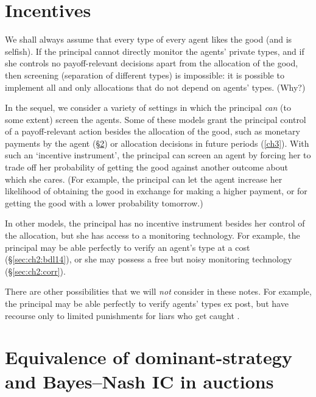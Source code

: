 \section{Incentives}
\label{sec:ch2:ic}

We shall always assume that every type of every agent likes the good (and is selfish).
If the principal cannot directly monitor the agents' private types,
and if she controls no payoff-relevant decisions apart from the allocation of the good, then screening (separation of different types) is impossible:
it is possible to implement all and only allocations that do not depend on agents' types. (Why?)

In the sequel, we consider a variety of settings in which the principal \emph{can} (to some extent) screen the agents.
Some of these models grant the principal control of a payoff-relevant action besides the allocation of the good,
such as monetary payments by the agent (§\ref{sec:ch2:bic_dsic})
or allocation decisions in future periods (\cref{ch3}).
With such an `incentive instrument', the principal can screen an agent by forcing her to trade off her probability of getting the good against another outcome about which she cares.
(For example, the principal can let the agent increase her likelihood of obtaining the good in exchange for making a higher payment, or for getting the good with a lower probability tomorrow.)

In other models, the principal has no incentive instrument besides her control of the allocation, but she has access to a monitoring technology.
For example, the principal may be able perfectly to verify an agent's type at a cost (§\ref{sec:ch2:bdl14}), or she may possess a free but noisy monitoring technology (§\ref{sec:ch2:corr}).

There are other possibilities that we will \emph{not} consider in these notes.
For example, the principal may be able perfectly to verify agents' types ex post, but have recourse only to limited punishments for liars who get caught \parencite[see][]{MylovanovZapechelnyuk2017}.



\section{Equivalence of dominant-strategy and Bayes--Nash IC in auctions}
\label{sec:ch2:bic_dsic}

